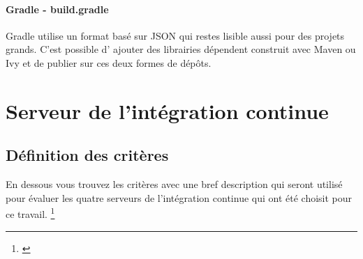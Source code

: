 	\paragraph{Gradle - build.gradle}
		Gradle utilise un format basé sur JSON qui restes lisible aussi pour des projets grands. C'est possible d' ajouter des librairies dépendent construit avec Maven ou Ivy et de publier sur ces deux formes de dépôts.

\newpage
\section{Serveur de l'intégration continue}

\subsection{Définition des critères}

En dessous vous trouvez les critères avec une bref description qui seront utilisé pour évaluer les quatre serveurs de l'intégration continue qui ont été choisit pour ce travail. \footnote{\cite{ibmciserver}}


